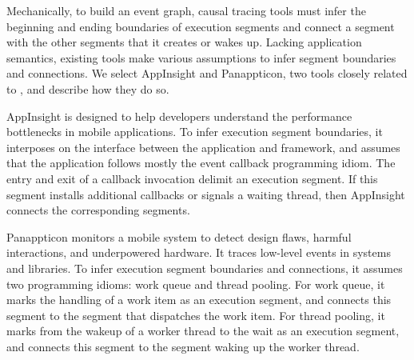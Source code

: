 Mechanically, to build an event graph, causal tracing tools must infer the
beginning and ending boundaries of execution segments and connect a
segment with the other segments that it creates or wakes up. Lacking
application semantics, existing tools make various assumptions to infer
segment boundaries and connections.  We select AppInsight and Panappticon,
two tools closely related to \xxx, and describe how they do so.

AppInsight is designed to help developers understand the performance
bottlenecks in mobile applications.  To infer execution segment
boundaries, it interposes on the interface between the application and
framework, and assumes that the application follows mostly the event
callback programming idiom.  The entry and exit of a callback invocation
delimit an execution segment.  If this segment installs additional
callbacks or signals a waiting thread, then AppInsight connects the
corresponding segments.

Panappticon monitors a mobile system to detect design flaws, harmful
interactions, and underpowered hardware. It traces low-level events in
systems and libraries.  To infer execution segment boundaries and
connections, it assumes two programming idioms: work queue and thread
pooling.  For work queue, it marks the handling of a work item as an
execution segment, and connects this segment to the segment that
dispatches the work item.  For thread pooling, it marks from the wakeup of
a worker thread to the wait as an execution segment, and connects this
segment to the segment waking up the worker thread.







